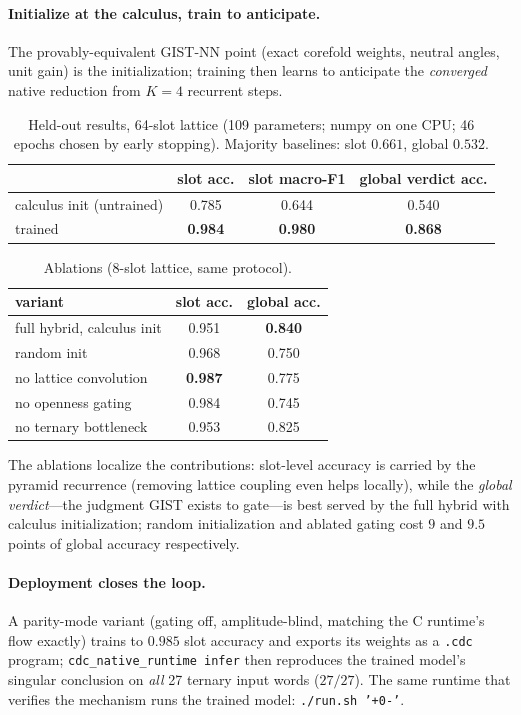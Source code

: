 \documentclass[11pt]{article}
\begin{document}
\paragraph{Initialize at the calculus, train to anticipate.} The
provably-equivalent GIST-NN point (exact corefold weights, neutral
angles, unit gain) is the initialization; training then learns to
anticipate the \emph{converged} native reduction from $K{=}4$ recurrent
steps.

\begin{table}[t]
\centering
\caption{Held-out results, 64-slot lattice (109 parameters; numpy on one
CPU; 46 epochs chosen by early stopping). Majority baselines: slot
$0.661$, global $0.532$.}
\begin{tabular}{lccc}
\toprule
 & slot acc. & slot macro-F1 & global verdict acc.\\
\midrule
calculus init (untrained) & 0.785 & 0.644 & 0.540\\
trained & \textbf{0.984} & \textbf{0.980} & \textbf{0.868}\\
\bottomrule
\end{tabular}
\end{table}

\begin{table}[t]
\centering
\caption{Ablations (8-slot lattice, same protocol).}
\begin{tabular}{lcc}
\toprule
variant & slot acc. & global acc.\\
\midrule
full hybrid, calculus init & 0.951 & \textbf{0.840}\\
random init & 0.968 & 0.750\\
no lattice convolution & \textbf{0.987} & 0.775\\
no openness gating & 0.984 & 0.745\\
no ternary bottleneck & 0.953 & 0.825\\
\bottomrule
\end{tabular}
\end{table}

The ablations localize the contributions: slot-level accuracy is carried
by the pyramid recurrence (removing lattice coupling even helps locally),
while the \emph{global verdict}---the judgment GIST exists to gate---is
best served by the full hybrid with calculus initialization; random
initialization and ablated gating cost $9$ and $9.5$ points of global
accuracy respectively.

\paragraph{Deployment closes the loop.} A parity-mode variant (gating
off, amplitude-blind, matching the C runtime's flow exactly) trains to
$0.985$ slot accuracy and exports its weights as a \texttt{.cdc} program;
\texttt{cdc\_native\_runtime infer} then reproduces the trained model's
singular conclusion on \emph{all} 27 ternary input words ($27/27$).
The same runtime that verifies the mechanism runs the trained model:
\texttt{./run.sh '+0-'}.
\end{document}
